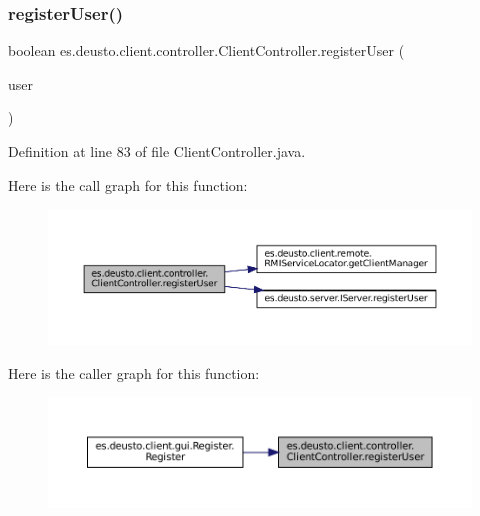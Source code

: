 \subsubsection{\texorpdfstring{registerUser()}{registerUser()}}
{\footnotesize\ttfamily boolean es.\+deusto.\+client.\+controller.\+Client\+Controller.\+register\+User (\begin{DoxyParamCaption}\item[{\mbox{\hyperlink{classes_1_1deusto_1_1server_1_1data_1_1_user_details_d_t_o}{User\+Details\+D\+TO}}}]{user }\end{DoxyParamCaption})}



Definition at line 83 of file Client\+Controller.\+java.

Here is the call graph for this function\+:
\nopagebreak
\begin{figure}[H]
\begin{center}
\leavevmode
\includegraphics[width=350pt]{classes_1_1deusto_1_1client_1_1controller_1_1_client_controller_a8f77e4957f536e48d7012d643d2c6cb8_cgraph}
\end{center}
\end{figure}
Here is the caller graph for this function\+:
\nopagebreak
\begin{figure}[H]
\begin{center}
\leavevmode
\includegraphics[width=350pt]{classes_1_1deusto_1_1client_1_1controller_1_1_client_controller_a8f77e4957f536e48d7012d643d2c6cb8_icgraph}
\end{center}
\end{figure}
\mbox{\label{classes_1_1deusto_1_1client_1_1controller_1_1_client_controller_ad1a2384c7c7f73d40d8d50c4bf77be7d}} 
